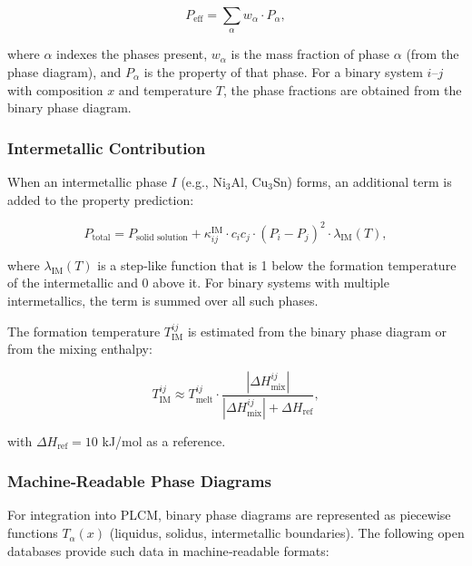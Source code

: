 \documentclass[12pt,a4paper]{article}
\begin{document}
	\begin{equation}
		P_{\text{eff}} = \sum_{\alpha} w_{\alpha} \cdot P_{\alpha},
		\label{eq:phase-weighted}
	\end{equation}
	
	where \(\alpha\) indexes the phases present, \(w_{\alpha}\) is the mass fraction of phase \(\alpha\) (from the phase diagram), and \(P_{\alpha}\) is the property of that phase. For a binary system \(i\)–\(j\) with composition \(x\) and temperature \(T\), the phase fractions are obtained from the binary phase diagram.
	
	\subsubsection{Intermetallic Contribution}
	
	When an intermetallic phase \(I\) (e.g., Ni\(_3\)Al, Cu\(_3\)Sn) forms, an additional term is added to the property prediction:
	
	\begin{equation}
		P_{\text{total}} = P_{\text{solid solution}} + \kappa_{ij}^{\text{IM}} \cdot c_i c_j \cdot (P_i - P_j)^2 \cdot \lambda_{\text{IM}}(T),
		\label{eq:intermetallic-term}
	\end{equation}
	
	where \(\lambda_{\text{IM}}(T)\) is a step‑like function that is 1 below the formation temperature of the intermetallic and 0 above it. For binary systems with multiple intermetallics, the term is summed over all such phases.
	
	The formation temperature \(T_{\text{IM}}^{ij}\) is estimated from the binary phase diagram or from the mixing enthalpy:
	
	\begin{equation}
		T_{\text{IM}}^{ij} \approx T_{\text{melt}}^{ij} \cdot \frac{|\Delta H_{\text{mix}}^{ij}|}{|\Delta H_{\text{mix}}^{ij}| + \Delta H_{\text{ref}}},
		\label{eq:tim-approximation}
	\end{equation}
	
	with \(\Delta H_{\text{ref}} = 10\) kJ/mol as a reference.
	
	\subsubsection{Machine‑Readable Phase Diagrams}
	
	For integration into PLCM, binary phase diagrams are represented as piecewise functions \(T_{\alpha}(x)\) (liquidus, solidus, intermetallic boundaries). The following open databases provide such data in machine‑readable formats:
	
\end{document}
